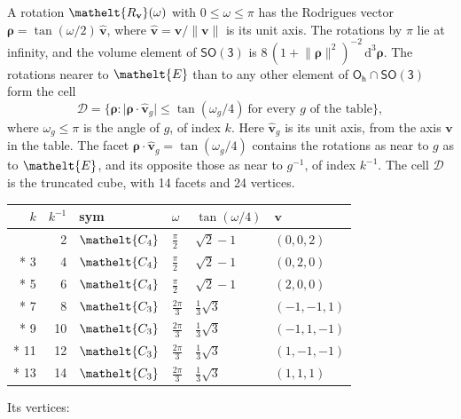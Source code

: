 \documentclass[10pt,a4paper]{article}
\numberwithin{equation}{section}
\newcommand{\eltfont}[1]{{\let\sigma\eltsigma\mathelt{#1}}}
\newcommand{\grp}[1]{\mathsf{#1}}
\newcommand{\cls}[1]{\eltfont{#1}}
\newcommand{\elt}[1]{\eltfont{#1}}
\newcommand{\dirvec}[3]{(#1, #2, #3)}
\newcommand{\unitaxis}{\hat{\mathbf{v}}}
\newcommand{\vv}{\mathbf{v}}
\newcommand{\diff}{\mathrm{d}}
\newcommand{\rodrigues}{\boldsymbol{\rho}}
\newcommand{\fcell}{\mathcal{D}}
\begin{document}
\leavevmode\label{n:vector.rodrigues}\label{n:vector.unitaxis}A rotation $\elt{R_{\vv}}(\omega)$ with $0 \le \omega \le \pi$ has the Rodrigues vector $\rodrigues = \tan(\omega/2)\,\unitaxis$, where $\unitaxis = \vv/\lVert\vv\rVert$ is its unit axis. The rotations by $\pi$ lie at infinity, and the volume element of \href{SO3.pdf}{$\grp{SO(3)}$} is $8\,(1 + \lVert\rodrigues\rVert^2)^{-2}\,\diff^3\rodrigues$.
\leavevmode\label{n:set.cell}The rotations nearer to $\elt{E}$ than to any other element of $\grp{O_{h}} \cap \grp{SO(3)}$ form the cell
\begin{equation}\label{e:cell}\fcell = \bigl\{\rodrigues : \lvert\rodrigues\cdot\unitaxis_g\rvert \le \tan(\omega_g/4)\ \text{for every $g$ of the table}\bigr\},\end{equation}
where $\omega_g \le \pi$ is the angle of $g$, of index $k$. Here $\unitaxis_g$ is its unit axis, from the axis $\vv$ in the table. The facet $\rodrigues\cdot\unitaxis_g = \tan(\omega_g/4)$ contains the rotations as near to $g$ as to $\elt{E}$, and its opposite those as near to $g^{-1}$, of index $k^{-1}$. The cell $\fcell$ is the truncated cube, with 14 facets and 24 vertices.
{\small{\renewcommand{\arraystretch}{1.3}\begin{longtable}{@{}rrllll@{}}\toprule
$k$ & $k^{-1}$ & sym & $\omega$ & $\tan(\omega/4)$ & $\vv$\\\midrule\endhead
\bottomrule\endfoot\endlastfoot
1 & 2 & $\cls{C_{4}}$ & $\tfrac{\pi}{2}$ & $\sqrt{2} - 1$ & $\dirvec{0}{0}{2}$\\*
3 & 4 & $\cls{C_{4}}$ & $\tfrac{\pi}{2}$ & $\sqrt{2} - 1$ & $\dirvec{0}{2}{0}$\\*
5 & 6 & $\cls{C_{4}}$ & $\tfrac{\pi}{2}$ & $\sqrt{2} - 1$ & $\dirvec{2}{0}{0}$\\*
7 & 8 & $\cls{C_{3}}$ & $\tfrac{2\pi}{3}$ & $\tfrac{1}{3}\sqrt{3}$ & $\dirvec{-1}{-1}{1}$\\*
9 & 10 & $\cls{C_{3}}$ & $\tfrac{2\pi}{3}$ & $\tfrac{1}{3}\sqrt{3}$ & $\dirvec{-1}{1}{-1}$\\*
11 & 12 & $\cls{C_{3}}$ & $\tfrac{2\pi}{3}$ & $\tfrac{1}{3}\sqrt{3}$ & $\dirvec{1}{-1}{-1}$\\*
13 & 14 & $\cls{C_{3}}$ & $\tfrac{2\pi}{3}$ & $\tfrac{1}{3}\sqrt{3}$ & $\dirvec{1}{1}{1}$\\
\bottomrule\end{longtable}}}
\leavevmode\label{n:head.vertex}Its vertices:
\end{document}
